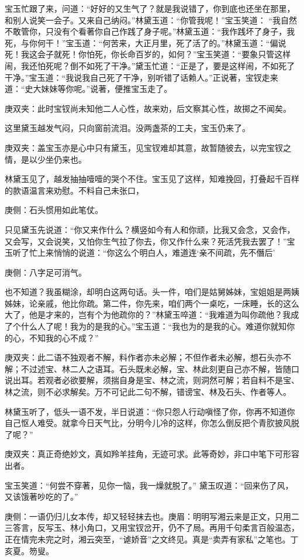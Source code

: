 \begin{parag}
    宝玉忙跟了来，问道：“好好的又生气了？就是我说错了，你到底也还坐在那里，和别人说笑一会子。又来自己纳闷。”林黛玉道：“你管我呢！”宝玉笑道： “我自然不敢管你，只没有个看著你自己作践了身子呢。”林黛玉道：“我作践坏了身子，我死，与你何干！”宝玉道：“何苦来，大正月里，死了活了的。”林黛玉道：“偏说死！我这会子就死！你怕死，你长命百岁的，如何？”宝玉笑道：“要象只管这样闹，我还怕死呢？倒不如死了干净。”黛玉忙道：“正是了，要是这样闹，不如死了干净。”宝玉道：“我说我自己死了干净，别听错了话赖人。”正说著，宝钗走来道：“史大妹妹等你呢。”说著，便推宝玉走了。\begin{note}庚双夹：此时宝钗尚未知他二人心性，故来劝，后文察其心性，故掷之不闻矣。\end{note}这里黛玉越发气闷，只向窗前流泪。没两盏茶的工夫，宝玉仍来了。\begin{note}庚双夹：盖宝玉亦是心中只有黛玉，见宝钗难却其意，故暂随彼去，以完宝钗之情，是以少坐仍来也。\end{note}林黛玉见了，越发抽抽噎噎的哭个不住。宝玉见了这样，知难挽回，打叠起千百样的款语温言来劝慰。不料自己未张口，\begin{note}庚侧：石头惯用如此笔仗。\end{note}只见黛玉先说道：“你又来作什么？横竖如今有人和你顽，比我又会念，又会作，又会写，又会说笑，又怕你生气拉了你去，你又作什么来？死活凭我去罢了！”宝玉听了忙上来悄悄的说道：“你这么个明白人，难道连‘亲不间疏，先不僭后’\begin{note}庚侧：八字足可消气。\end{note}也不知道？我虽糊涂，却明白这两句话。头一件，咱们是姑舅姊妹，宝姐姐是两姨姊妹，论亲戚，他比你疏。第二件，你先来，咱们两个一桌吃，一床睡，长的这么大了，他是才来的，岂有个为他疏你的？”林黛玉啐道：“我难道为叫你疏他？我成了个什么人了呢！我为的是我的心。”宝玉道：“我也为的是我的心。难道你就知你的心，不知我的心不成？”\begin{note}庚双夹：此二语不独观者不解，料作者亦未必解；不但作者未必解，想石头亦不解；不过述宝、林二人之语耳。石头既未必解，宝、林此刻更自己亦不解，皆随口说出耳。若观者必欲要解，须揣自身是宝、林之流，则洞然可解；若自料不是宝、林之流，则不必求解矣。万不可记此二句不解，错谤宝、林及石头、作者等人。\end{note}林黛玉听了，低头一语不发，半日说道：“你只怨人行动嗔怪了你，你再不知道你自己怄人难受。就拿今日天气比，分明今儿冷的这样，你怎么倒反把个青肷披风脱了呢？”\begin{note}庚双夹：真正奇绝妙文，真如羚羊挂角，无迹可求。此等奇妙，非口中笔下可形容出者。\end{note}宝玉笑道：“何尝不穿著，见你一恼，我一燥就脱了。” 黛玉叹道：“回来伤了风，又该饿著吵吃的了。”\begin{note}庚侧：一语仍归儿女本传，却又轻轻抹去也。庚眉：明明写湘云来是正文，只用二三答言，反写玉、林小角口，又用宝钗岔开，仍不了局。再用千句柔言百般温态，正在情完未完之时，湘云突至，“谑娇音”之文终见。真是“卖弄有家私”之笔也。丁亥夏。笏叟。\end{note}
\end{parag}


